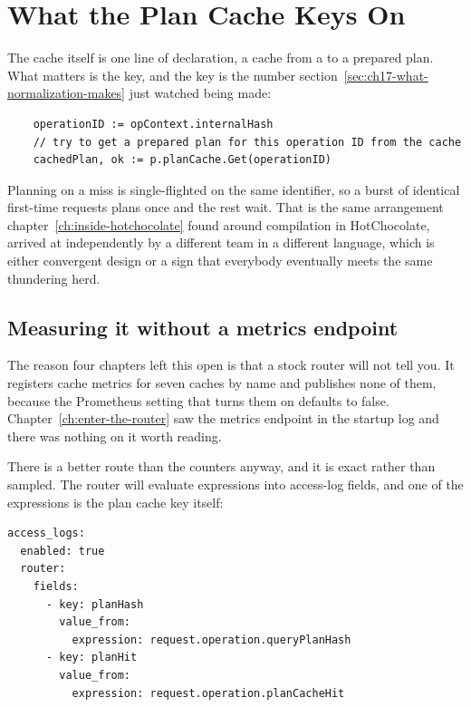 \section{What the Plan Cache Keys On}
\label{sec:ch17-what-the-plan-cache-keys-on}
%

The cache itself is one line of declaration, a  cache from a
 to a prepared plan. What matters is the key, and the key is the
number section~\ref{sec:ch17-what-normalization-makes} just watched being made:

\begin{verbatim}
	operationID := opContext.internalHash
	// try to get a prepared plan for this operation ID from the cache
	cachedPlan, ok := p.planCache.Get(operationID)
\end{verbatim}

Planning on a miss is single-flighted on the same identifier, so a burst of
identical first-time requests plans once and the rest wait. That is the same
arrangement chapter~\ref{ch:inside-hotchocolate} found around compilation in
HotChocolate, arrived at independently by a different team in a different
language, which is either convergent design or a sign that everybody eventually
meets the same thundering herd.

\subsection*{Measuring it without a metrics endpoint}

%
The reason four chapters left this open is that a stock router will not tell
you. It registers cache metrics for seven caches by name and publishes none of
them, because the Prometheus setting that turns them on defaults to false.
Chapter~\ref{ch:enter-the-router} saw the metrics endpoint in the startup log
and there was nothing on it worth reading.

There is a better route than the counters anyway, and it is exact rather than
sampled. The router will evaluate expressions into access-log fields, and one of
the expressions is the plan cache key itself:

\begin{verbatim}
access_logs:
  enabled: true
  router:
    fields:
      - key: planHash
        value_from:
          expression: request.operation.queryPlanHash
      - key: planHit
        value_from:
          expression: request.operation.planCacheHit
\end{verbatim}


